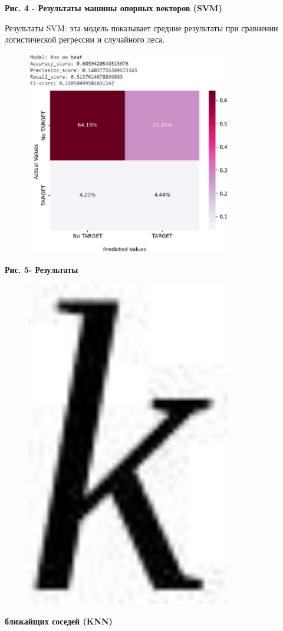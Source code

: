 {\bfseries Рис. 4 - Результаты машины опорных векторов (SVM)}

Результаты SVM: эта модель показывает средние результаты при сравнении
логистической регрессии и случайного леса.

\begin{figure}[H]
	\centering
	\includegraphics[width=0.8\textwidth]{assets/123}
	\caption*{}
\end{figure}

{\bfseries Рис. 5- Результаты}
\begin{figure}[H]
	\centering
	\includegraphics[width=0.8\textwidth]{assets/92}
	\caption*{}
\end{figure}{\bfseries ближайщих соседей (KNN)}

